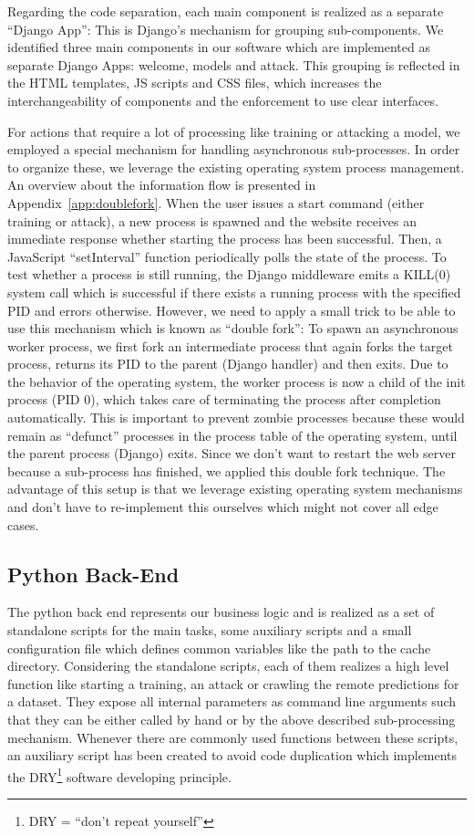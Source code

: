 Regarding the code separation, each main component is realized as a separate \enquote{Django App}: This is Django's mechanism for grouping sub-components.
We identified three main components in our software which are implemented as separate Django Apps: welcome, models and attack.
This grouping is reflected in the HTML templates, JS scripts and CSS files, which increases the interchangeability of components and the enforcement to use clear interfaces.

For actions that require a lot of processing like training or attacking a model, we employed a special mechanism for handling asynchronous sub-processes.
In order to organize these, we leverage the existing operating system process management.
An overview about the information flow is presented in Appendix~\ref{app:doublefork}.
When the user issues a start command (either training or attack), a new process is spawned and the website receives an immediate response whether starting the process has been successful.
Then, a JavaScript \enquote{setInterval} function periodically polls the state of the process.
To test whether a process is still running, the Django middleware emits a KILL(0) system call which is successful if there exists a running process with the specified PID and errors otherwise.
However, we need to apply a small trick to be able to use this mechanism which is known as \enquote{double fork}: To spawn an asynchronous worker process, we first fork an intermediate process that again forks the target process, returns its PID to the parent (Django handler) and then exits.
Due to the behavior of the operating system, the worker process is now a child of the init process (PID 0), which takes care of terminating the process after completion automatically.
This is important to prevent zombie processes because these would remain as \enquote{defunct} processes in the process table of the operating system, until the parent process (Django) exits.
Since we don't want to restart the web server because a sub-process has finished, we applied this double fork technique.
The advantage of this setup is that we leverage existing operating system mechanisms and don't have to re-implement this ourselves which might not cover all edge cases.

\subsection{Python Back-End}\label{subsec:backend}
The python back end represents our business logic and is realized as a set of standalone scripts for the main tasks, some auxiliary scripts and a small configuration file which defines common variables like the path to the cache directory.
Considering the standalone scripts, each of them realizes a high level function like starting a training, an attack or crawling the remote predictions for a dataset.
They expose all internal parameters as command line arguments such that they can be either called by hand or by the above described sub-processing mechanism.
Whenever there are commonly used functions between these scripts, an auxiliary script has been created to avoid code duplication which implements the DRY\footnote{DRY = \enquote{don't repeat yourself}} software developing principle.


